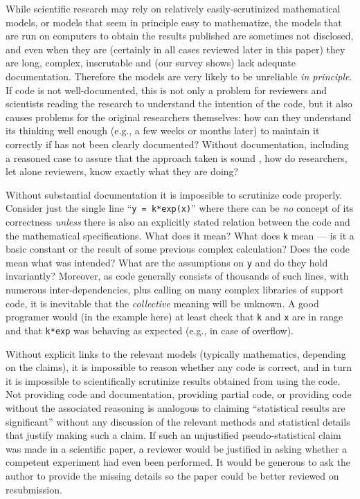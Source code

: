 While scientific research may rely on relatively easily-scrutinized mathematical models, or models that seem in principle easy to mathematize, the models that are run on computers to obtain the results published are sometimes not disclosed, and even when they are (certainly in all cases reviewed later in this paper) they are long, complex, inscrutable and (our survey shows) lack adequate documentation. Therefore the models are very likely to be unreliable \emph{in principle}. If code is not well-documented, this is not only a problem for reviewers and scientists reading the research to understand the intention of the code, but it also causes problems for the original researchers themselves: how can they understand its thinking well enough (e.g., a few weeks or months later) to maintain it correctly if has not been clearly documented? Without documentation, including a reasoned case to assure that the approach taken is sound \cite{assurance-case}, how do researchers, let alone reviewers, know exactly what they are doing?

Without substantial documentation it is impossible to scrutinize code properly. Consider just the single line ``\texttt{y = k*exp(x)}'' where there can be \emph{no\/} concept of its correctness \emph{unless\/} there is also an explicitly stated relation between the code and the mathematical specifications. What does it mean? What does \texttt{k} mean --- is it a basic constant or the result of some previous complex calculation? Does the code mean what was intended? What are the assumptions on \texttt{y} and do they hold invariantly? Moreover, as code generally consists of thousands of such lines, with numerous inter-dependencies, plus calling on many complex libraries of support code, it is inevitable that the \emph{collective\/} meaning will be unknown. A good programer would (in the example here) at least check that \texttt{k} and \texttt{x} are in range and that \texttt{k*exp} was behaving as expected (e.g., in case of overflow).

Without explicit links to the relevant models (typically mathematics, depending on the claims), it is impossible to reason whether any code is correct, and in turn it is impossible to scientifically scrutinize results obtained from using the code. Not providing code and documentation, providing partial code, or providing code without the associated reasoning is analogous to claiming ``statistical results are significant'' without any discussion of the relevant methods and statistical details that justify making such a claim. If such an unjustified pseudo-statistical claim was made in a scientific paper, a reviewer would be justified in asking whether a competent experiment had even been performed. It would be generous to ask the author to provide the missing details so the paper could be better reviewed on resubmission. 

